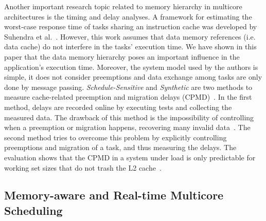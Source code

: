 \documentclass[conference]{IEEEtran}
\begin{document}
Another important research topic related to memory hierarchy in multicore architectures is the timing and delay analyses. A framework for estimating the worst-case response time of tasks sharing an instruction cache was developed by Suhendra et al.~\cite{Li2009}. However, this work assumes that data memory references (i.e. data cache) do not interfere in the tasks' execution time. We have shown in this paper that the data memory hierarchy poses an important influence in the application's execution time. Moreover, the system model used by the authors is simple, it does not consider preemptions and data exchange among tasks are only done by message passing. \textit{Schedule-Sensitive} and \textit{Synthetic} are two methods to measure cache-related preemption and migration delays (CPMD)~\cite{Anderson2010a}. In the first method, delays are recorded online by executing tests and collecting the measured data. The drawback of this method is the impossibility of controlling when a preemption or migration happens, recovering many invalid data~\cite{Brandenburg2010a}. The second method tries to overcome this problem by explicitly controlling preemptions and migration of a task, and thus measuring the delays. The evaluation shows that the CPMD in a system under load is only predictable for working set sizes that do not trash the L2 cache~\cite{Anderson2010a}. 

\subsection{Memory-aware and Real-time Multicore Scheduling}
\end{document}
